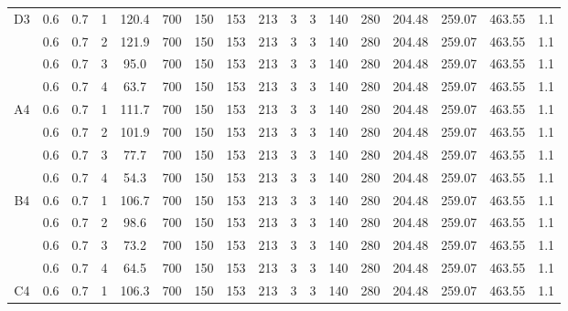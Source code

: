 \begin{table}[H]
{\begin{tabular}{|c|c|c|r|c|c|c|c|c|c|c|c|c|c|c|c|c|}
    \hline
    \multirow{4}[8]{*}{D3} & 0.6   & 0.7   & 1     & 120.4 & 700   & 150   & 153   & 213   & 3     & 3     & 140   & 280   & 204.48 & 259.07 & 463.55 & 1.1 \bigstrut\\
\cline{2-17}          & 0.6   & 0.7   & 2     & 121.9 & 700   & 150   & 153   & 213   & 3     & 3     & 140   & 280   & 204.48 & 259.07 & 463.55 & 1.1 \bigstrut\\
\cline{2-17}          & 0.6   & 0.7   & 3     & 95.0  & 700   & 150   & 153   & 213   & 3     & 3     & 140   & 280   & 204.48 & 259.07 & 463.55 & 1.1 \bigstrut\\
\cline{2-17}          & 0.6   & 0.7   & 4     & 63.7  & 700   & 150   & 153   & 213   & 3     & 3     & 140   & 280   & 204.48 & 259.07 & 463.55 & 1.1 \bigstrut\\
    \hline
    \multirow{4}[8]{*}{A4} & 0.6   & 0.7   & 1     & 111.7 & 700   & 150   & 153   & 213   & 3     & 3     & 140   & 280   & 204.48 & 259.07 & 463.55 & 1.1 \bigstrut\\
\cline{2-17}          & 0.6   & 0.7   & 2     & 101.9 & 700   & 150   & 153   & 213   & 3     & 3     & 140   & 280   & 204.48 & 259.07 & 463.55 & 1.1 \bigstrut\\
\cline{2-17}          & 0.6   & 0.7   & 3     & 77.7  & 700   & 150   & 153   & 213   & 3     & 3     & 140   & 280   & 204.48 & 259.07 & 463.55 & 1.1 \bigstrut\\
\cline{2-17}          & 0.6   & 0.7   & 4     & 54.3  & 700   & 150   & 153   & 213   & 3     & 3     & 140   & 280   & 204.48 & 259.07 & 463.55 & 1.1 \bigstrut\\
    \hline
    \multirow{4}[8]{*}{B4} & 0.6   & 0.7   & 1     & 106.7 & 700   & 150   & 153   & 213   & 3     & 3     & 140   & 280   & 204.48 & 259.07 & 463.55 & 1.1 \bigstrut\\
\cline{2-17}          & 0.6   & 0.7   & 2     & 98.6  & 700   & 150   & 153   & 213   & 3     & 3     & 140   & 280   & 204.48 & 259.07 & 463.55 & 1.1 \bigstrut\\
\cline{2-17}          & 0.6   & 0.7   & 3     & 73.2  & 700   & 150   & 153   & 213   & 3     & 3     & 140   & 280   & 204.48 & 259.07 & 463.55 & 1.1 \bigstrut\\
\cline{2-17}          & 0.6   & 0.7   & 4     & 64.5  & 700   & 150   & 153   & 213   & 3     & 3     & 140   & 280   & 204.48 & 259.07 & 463.55 & 1.1 \bigstrut\\
    \hline
    \multirow{4}[8]{*}{C4} & 0.6   & 0.7   & 1     & 106.3 & 700   & 150   & 153   & 213   & 3     & 3     & 140   & 280   & 204.48 & 259.07 & 463.55 & 1.1 \bigstrut\\

\end{tabular}}
\end{table}
